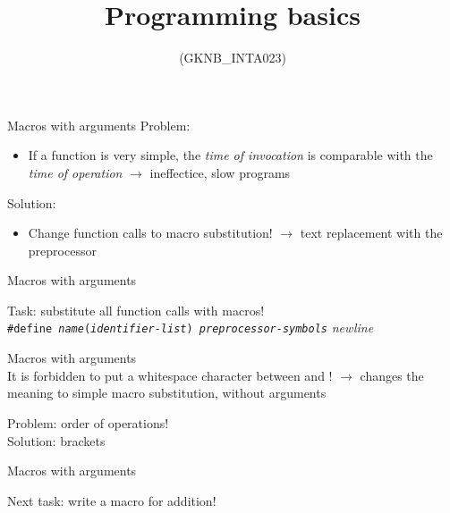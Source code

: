 \documentclass[usenames,dvipsnames,aspectratio=169]{beamer}
\title[Lecture 10.]{Programming basics}
\subtitle{(GKNB\_INTA023)}
\begin{document}
\begin{frame}[plain]
  \titlepage
\end{frame}

\begin{frame}{Macros with arguments}
  Problem:
  \begin{itemize}
    \item[] If a function is very simple, the \emph{time of invocation} is comparable with the \emph{time of operation} $\to$ ineffectice, slow programs
  \end{itemize}
  Solution:
  \begin{itemize}
    \item[] Change function calls to macro substitution! $\to$ text replacement with the preprocessor
  \end{itemize}
\end{frame}

\begin{frame}{Macros with arguments}
  \footnotesize
  \begin{exampleblock}{}
    
  \end{exampleblock}
  \vfill
  \normalsize
  Task: substitute all function calls with macros!\\
  \scriptsize 
  \texttt{\#define \emph{name}(\emph{identifier-list}) \emph{preprocessor-symbols}} \emph{newline}
\end{frame}

\begin{frame}{Macros with arguments}
   \\
  \small
  It is forbidden to put a whitespace character between  and \kiemel{\texttt{(}}! $\to$ changes the meaning to simple macro substitution, without arguments
  \scriptsize
  \begin{exampleblock}{}
    
  \end{exampleblock}
  \vfill
  \normalsize
  Problem: order of operations!\\
  Solution: brackets
\end{frame}

\begin{frame}{Macros with arguments}
  \scriptsize
  \begin{exampleblock}{}
    
  \end{exampleblock}
  \vfill
  \normalsize
  Next task: write a macro for addition!
\end{frame}
\end{document}
